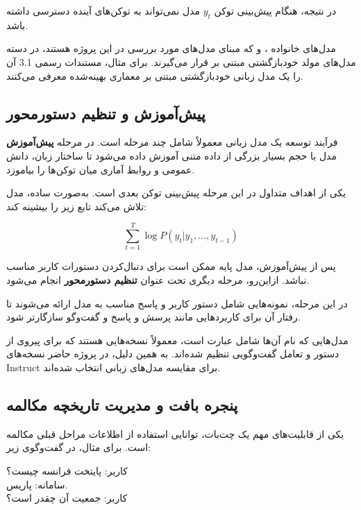 در نتیجه، هنگام پیش‌بینی توکن $y_t$ مدل نمی‌تواند به توکن‌های
آینده دسترسی داشته باشد.

مدل‌های خانواده
،
و
که مبنای مدل‌های مورد بررسی در این پروژه هستند، در دسته
مدل‌های مولد خودبازگشتی مبتنی بر  قرار می‌گیرند.
برای مثال، مستندات رسمی  3.1 آن را یک مدل زبانی
خودبازگشتی مبتنی بر معماری بهینه‌شده  معرفی
می‌کنند.


\subsection{پیش‌آموزش و تنظیم دستورمحور}

فرآیند توسعه یک مدل زبانی معمولاً شامل چند مرحله است.
در مرحله
\textbf{پیش‌آموزش}
مدل با حجم بسیار بزرگی از داده متنی آموزش داده می‌شود تا
ساختار زبان، دانش عمومی و روابط آماری میان توکن‌ها را بیاموزد.

یکی از اهداف متداول در این مرحله پیش‌بینی توکن بعدی است.
به‌صورت ساده، مدل تلاش می‌کند تابع زیر را بیشینه کند:

\begin{equation}
\sum_{t=1}^{T}
\log
P(y_t|y_1,\ldots,y_{t-1})
\end{equation}

پس از پیش‌آموزش، مدل پایه ممکن است برای دنبال‌کردن دستورات
کاربر مناسب نباشد.
ازاین‌رو، مرحله دیگری تحت عنوان
\textbf{تنظیم دستورمحور}
انجام می‌شود.

در این مرحله، نمونه‌هایی شامل دستور کاربر و پاسخ مناسب به مدل
ارائه می‌شوند تا رفتار آن برای کاربردهایی مانند پرسش و پاسخ و
گفت‌وگو سازگارتر شود.

مدل‌هایی که نام آن‌ها شامل عبارت
است، معمولاً نسخه‌هایی هستند که برای پیروی از دستور و تعامل
گفت‌وگویی تنظیم شده‌اند.
به همین دلیل، در پروژه حاضر نسخه‌های Instruct برای مقایسه
مدل‌های زبانی انتخاب شده‌اند.


\subsection{پنجره بافت و مدیریت تاریخچه مکالمه}

یکی از قابلیت‌های مهم یک چت‌بات، توانایی استفاده از اطلاعات
مراحل قبلی مکالمه است.
برای مثال، در گفت‌وگوی زیر:

\begin{center}
کاربر: پایتخت فرانسه چیست؟ \\
سامانه: پاریس. \\
کاربر: جمعیت آن چقدر است؟
\end{center}

